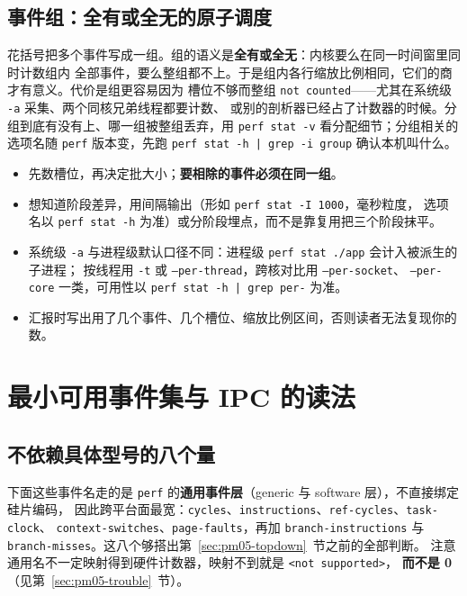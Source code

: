 \documentclass[12pt,a4paper,fontset=fandol]{ctexbook}
\newcommand{\Tp}[1]{\texttt{#1}}
\newcommand{\Bk}{\discretionary{}{}{}}
\newcommand{\Mx}[1]{\textsf{#1}}
\begin{document}
\subsection*{事件组：全有或全无的原子调度}

花括号把多个事件写成一组。组的语义是\textbf{全有或全无}：内核要么在同一时间窗里同时计数组内
全部事件，要么整组都不上。于是组内各行缩放比例相同，它们的商才有意义。代价是组更容易因为
槽位不够而整组 \Tp{not counted}——尤其在系统级 \Tp{-a} 采集、两个同核兄弟线程都要计数、
或别的剖析器已经占了计数器的时候。分组到底有没有上、哪一组被整组丢弃，用 \Tp{perf stat -v}
看分配细节；分组相关的选项名随 \Tp{perf} 版本变，先跑 \Tp{perf stat -h | grep -i group}
确认本机叫什么。

\begin{guideline}[title={一次运行的事件预算}]
\begin{itemize}
  \item 先数槽位，再决定批大小；\textbf{要相除的事件必须在同一组}。
  \item 想知道阶段差异，用间隔输出（形如 \Tp{perf stat -I 1000}，毫秒粒度，
        选项名以 \Tp{perf stat -h} 为准）或分阶段埋点，而不是靠复用把三个阶段抹平。
  \item 系统级 \Tp{-a} 与进程级默认口径不同：进程级 \Tp{perf stat ./app} 会计入被派生的子进程；
        按线程用 \Tp{-t} 或 \Tp{--per{\Bk}-thread}，跨核对比用 \Tp{--per{\Bk}-socket}、
        \Tp{--per{\Bk}-core} 一类，可用性以 \Tp{perf stat -h | grep per-} 为准。
  \item 汇报时写出用了几个事件、几个槽位、缩放比例区间，否则读者无法复现你的数。
\end{itemize}
\end{guideline}

\section{最小可用事件集与 \Mx{IPC} 的读法}
\label{sec:pm05-minset}

\subsection*{不依赖具体型号的八个量}

下面这些事件名走的是 \Tp{perf} 的\textbf{通用事件层}（generic 与 software 层），不直接绑定硅片编码，
因此跨平台面最宽：\Tp{cycles}、\Tp{instructions}、\Tp{ref{\Bk}-cycles}、\Tp{task{\Bk}-clock}、
\Tp{context{\Bk}-switches}、\Tp{page{\Bk}-faults}，再加 \Tp{branch{\Bk}-instructions} 与
\Tp{branch{\Bk}-misses}。这八个够搭出第~\ref{sec:pm05-topdown}~节之前的全部判断。
注意通用名不一定映射得到硬件计数器，映射不到就是 \Tp{<not supported>}，
\textbf{而不是 0}（见第~\ref{sec:pm05-trouble}~节）。
\end{document}
